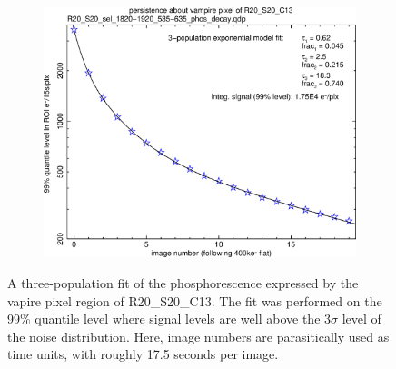 \begin{figure}[!htbp]
\centering
\begin{subfigure}{0.8\textwidth}    
  \centering
  \includegraphics[width=\textwidth]{figures/phosphorescence-survey/phos_kinetics/R20_S20_sel_1820-1920_535-635_phos_decay_fit.png}    
\end{subfigure}
\caption{A three-population fit of the phosphorescence expressed by the vapire pixel region of R20\_S20\_C13. The fit was performed on the 99\% quantile level where signal levels are well above the $3\sigma$ level of the noise distribution. Here, image numbers are parasitically used as time units, with roughly 17.5 seconds per image.}
\label{fig:phos:kinetics:fit:R20S20C13}
\end{figure}

